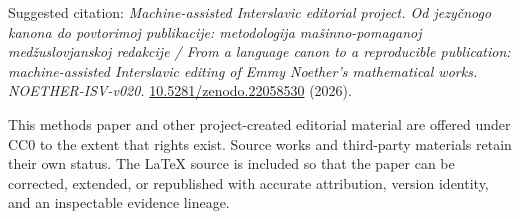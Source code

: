 \documentclass[11pt]{article}
\newcommand{\doiurl}[1]{\href{https://doi.org/#1}{#1}}
\begin{document}
Suggested citation: \emph{Machine-assisted Interslavic editorial project. Od jezyčnogo kanona do povtorimoj publikacije: metodologija mašinno-pomaganoj medžuslovjanskoj redakcije / From a language canon to a reproducible publication: machine-assisted Interslavic editing of Emmy Noether's mathematical works. NOETHER-ISV-v020.} \doiurl{10.5281/zenodo.22058530} (2026).

This methods paper and other project-created editorial material are offered under CC0 to the extent that rights exist. Source works and third-party materials retain their own status. The LaTeX source is included so that the paper can be corrected, extended, or republished with accurate attribution, version identity, and an inspectable evidence lineage.
\end{document}
